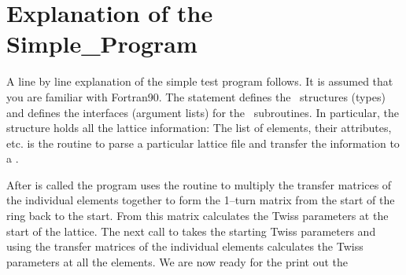 \section{Explanation of the Simple\_Program}

A line by line explanation of the simple test program follows. It is
assumed that you are familiar with Fortran90.  The 
statement defines the \bmad\ structures (types) and defines the
interfaces (argument lists) for the \bmad\ subroutines. In particular,
the  structure holds all the lattice information: The
list of elements, their attributes, etc.  is the
routine to parse a particular lattice file and transfer the
information to a . 

After  is called the program uses the routine
 to multiply the transfer matrices of the individual
elements together to form the 1--turn matrix from the start of the ring
back to the start. From this matrix  calculates the
Twiss parameters at the start of the lattice. The next call to
 takes the starting Twiss parameters and using
the transfer matrices of the individual elements calculates the Twiss
parameters at all the elements. We are now ready for the print out the
